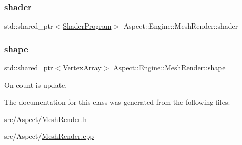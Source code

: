 \mbox{\label{class_aspect_1_1_engine_1_1_mesh_render_af49c803c0ee4b4e72e8d87455e74ae5e}} 
\subsubsection{\texorpdfstring{shader}{shader}}
{\footnotesize\ttfamily std\+::shared\+\_\+ptr$<$\mbox{\hyperlink{class_aspect_1_1_engine_1_1_shader_program}{Shader\+Program}}$>$ Aspect\+::\+Engine\+::\+Mesh\+Render\+::shader\hspace{0.3cm}{\ttfamily [private]}}

\mbox{\label{class_aspect_1_1_engine_1_1_mesh_render_af137747f679a92eec890a25cbdbc9e8a}} 
\subsubsection{\texorpdfstring{shape}{shape}}
{\footnotesize\ttfamily std\+::shared\+\_\+ptr$<$\mbox{\hyperlink{class_aspect_1_1_engine_1_1_vertex_array}{Vertex\+Array}}$>$ Aspect\+::\+Engine\+::\+Mesh\+Render\+::shape\hspace{0.3cm}{\ttfamily [private]}}



On count is update. 



The documentation for this class was generated from the following files\+:\begin{DoxyCompactItemize}
\item 
src/\+Aspect/\mbox{\hyperlink{_mesh_render_8h}{Mesh\+Render.\+h}}\item 
src/\+Aspect/\mbox{\hyperlink{_mesh_render_8cpp}{Mesh\+Render.\+cpp}}\end{DoxyCompactItemize}
